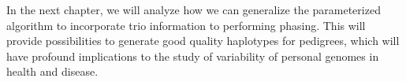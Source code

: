 % 	
	
	In the next chapter, we will analyze how we can generalize the parameterized algorithm to incorporate trio information to performing phasing. 
	This will provide possibilities to generate good quality haplotypes for pedigrees, which will have profound implications to the study of variability of personal genomes in health and disease.




% 
% 






